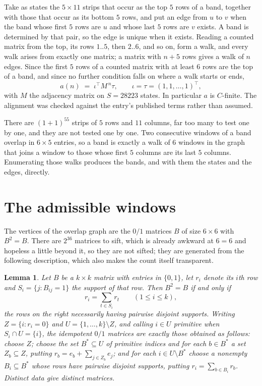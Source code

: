 \documentclass[11pt,a4paper]{article}
\theoremstyle{plain}
\newtheorem{lemma}[theorem]{Lemma}
\theoremstyle{definition}
\begin{document}
Take as states the $5\times11$ strips that occur as the top $5$ rows of a band,
together with those that occur as its bottom $5$ rows, and put an edge from $u$ to $v$
when the band whose first $5$ rows are $u$ and whose last $5$ rows are $v$ exists.
A band is determined by that pair, so the edge is unique when it exists. Reading a counted
matrix from the top, its rows $1..5$, then $2..6$, and so on, form a walk, and every
walk arises from exactly one matrix; a matrix with $n+5$ rows gives a walk of $n$ edges.
Since the first $5$ rows of a counted matrix with at least $6$ rows are the top of a
band, and since no further condition falls on where a walk starts or ends,
\[
a(n)\;=\;\iota^{\!\top}M^{\,n}\tau ,\qquad \iota=\tau=(1,1,\dots,1)^{\!\top},
\]
with $M$ the adjacency matrix on $S=28223$ states. In particular $a$ is $C$-finite. The
alignment was checked against the entry's published terms rather than assumed.

There are $(1 + 1)^{55}$ strips of $5$ rows and $11$ columns, far too
many to test one by one, and they are not tested one by one. Two consecutive windows of a band
overlap in $6\times5$ entries, so a band is exactly a walk of $6$ windows in
the graph that joins a window to those whose first $5$ columns are its last $5$
columns. Enumerating those walks produces the bands, and with them the states and the edges,
directly.

\section{The admissible windows}

The vertices of the overlap graph are the $0/1$ matrices $B$ of size $6\times6$ with
$B^2=B$. There are $2^{36}$ matrices to sift, which is already awkward at $6=6$ and
hopeless a little beyond it, so they are not sifted; they are generated from the following
description, which also makes the count itself transparent.

\begin{lemma}\label{lem:idem}
Let $B$ be a $k\times k$ matrix with entries in $\{0,1\}$, let $r_i$ denote its $i$th row and
$S_i=\{j:B_{ij}=1\}$ the support of that row. Then $B^2=B$ if and only if
\[
r_i=\sum_{t\in S_i}r_t \qquad (1\le i\le k),
\]
the rows on the right necessarily having pairwise disjoint supports. Writing
$Z=\{i:r_i=0\}$ and $U=\{1,\dots,k\}\setminus Z$, and calling $i\in U$ \emph{primitive}
when $S_i\cap U=\{i\}$, the idempotent $0/1$ matrices are exactly those obtained as follows:
choose $Z$; choose the set $B^{\ast}\subseteq U$ of primitive indices and for each
$b\in B^{\ast}$ a set $Z_b\subseteq Z$, putting $r_b=e_b+\sum_{j\in Z_b}e_j$; and for each
$i\in U\setminus B^{\ast}$ choose a nonempty $B_i\subseteq B^{\ast}$ whose rows have
pairwise disjoint supports, putting $r_i=\sum_{b\in B_i}r_b$. Distinct data give distinct
matrices.
\end{lemma}
\end{document}
